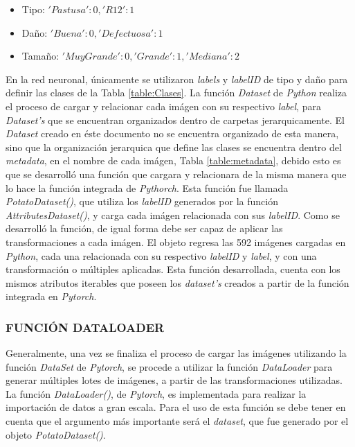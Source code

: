 			\begin{itemize}
				\item Tipo: ${'Pastusa': 0, 'R12': 1}$
				\item Daño: ${'Buena': 0, 'Defectuosa': 1}$
				\item Tamaño: ${'Muy Grande': 0, 'Grande': 1, 'Mediana': 2}$
			\end{itemize}

			En la red neuronal, únicamente se utilizaron \textit{labels} y \textit{labelID} de tipo y daño para definir las clases de la Tabla \ref{table:Clases}. La función \textit{Dataset} de \textit{Python} realiza el proceso de cargar y relacionar cada imágen con su respectivo \textit{label}, para \textit{Dataset's} que se encuentran organizados dentro de carpetas jerarquicamente. El \textit{Dataset} creado en éste documento no se encuentra organizado de esta manera, sino que la organización jerarquica que define las clases se encuentra dentro del \textit{metadata}, en el nombre de cada imágen, Tabla \ref{table:metadata}, debido esto es que se desarrolló una función que cargara y relacionara de la misma manera que lo hace la función integrada de \textit{Pythorch}. Esta función fue llamada \textit{PotatoDataset()}, que utiliza los \textit{labelID} generados por la función \textit{AttributesDataset()}, y carga cada imágen relacionada con sus \textit{labelID}. Como se desarrolló la función, de igual forma debe ser capaz de aplicar las transformaciones a cada imágen. El objeto regresa las 592 imágenes cargadas en \textit{Python}, cada una relacionada con su respectivo \textit{labelID} y \textit{label}, y con una transformación o múltiples aplicadas. Esta función desarrollada, cuenta con los mismos atributos iterables que poseen los \textit{dataset's} creados a partir de la función integrada en \textit{Pytorch}.			
			
		
			\subsubsection{FUNCIÓN DATALOADER}			
						
			Generalmente, una vez se finaliza el proceso de cargar las imágenes utilizando la función \textit{DataSet} de \textit{Pytorch}, se procede a utilizar la función \textit{DataLoader} para generar múltiples lotes de imágenes, a partir de las transformaciones utilizadas. La función \textit{DataLoader()}, de \textit{Pytorch}, es implementada para realizar la importación de datos a gran escala. Para el uso de esta función se debe tener en cuenta que el argumento más importante será el \textit{dataset}, que fue generado por el objeto \textit{PotatoDataset()}. \\
			
